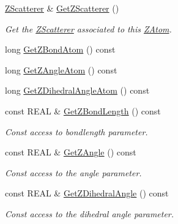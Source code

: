 \begin{DoxyCompactItemize}
\mbox{\label{class_obj_cryst_1_1_z_atom_aaf3d27dfba9cf85e2ef08abe17b6d309}} 
\mbox{\hyperlink{class_obj_cryst_1_1_z_scatterer}{Z\+Scatterer}} \& \mbox{\hyperlink{class_obj_cryst_1_1_z_atom_aaf3d27dfba9cf85e2ef08abe17b6d309}{Get\+Z\+Scatterer}} ()
\begin{DoxyCompactList}\small\item\em Get the \mbox{\hyperlink{class_obj_cryst_1_1_z_scatterer}{Z\+Scatterer}} associated to this \mbox{\hyperlink{class_obj_cryst_1_1_z_atom}{Z\+Atom}}. \end{DoxyCompactList}\item 
long \mbox{\hyperlink{class_obj_cryst_1_1_z_atom_ad562588cedd0e9e3eaee2dae1a4afa3e}{Get\+Z\+Bond\+Atom}} () const
\item 
long \mbox{\hyperlink{class_obj_cryst_1_1_z_atom_a058aa7bd3176e67001fdb7ee54594793}{Get\+Z\+Angle\+Atom}} () const
\item 
long \mbox{\hyperlink{class_obj_cryst_1_1_z_atom_a0c13c96b5329c654de8fa039edaffdee}{Get\+Z\+Dihedral\+Angle\+Atom}} () const
\item 
\mbox{\label{class_obj_cryst_1_1_z_atom_ae4a271658e07416c929254d33a17acd2}} 
const R\+E\+AL \& \mbox{\hyperlink{class_obj_cryst_1_1_z_atom_ae4a271658e07416c929254d33a17acd2}{Get\+Z\+Bond\+Length}} () const
\begin{DoxyCompactList}\small\item\em Const access to bondlength parameter. \end{DoxyCompactList}\item 
\mbox{\label{class_obj_cryst_1_1_z_atom_aed06248c63d52f3537c4c750271031df}} 
const R\+E\+AL \& \mbox{\hyperlink{class_obj_cryst_1_1_z_atom_aed06248c63d52f3537c4c750271031df}{Get\+Z\+Angle}} () const
\begin{DoxyCompactList}\small\item\em Const access to the angle parameter. \end{DoxyCompactList}\item 
\mbox{\label{class_obj_cryst_1_1_z_atom_a07b4b18233aba3ea87fa7fc23b6467a2}} 
const R\+E\+AL \& \mbox{\hyperlink{class_obj_cryst_1_1_z_atom_a07b4b18233aba3ea87fa7fc23b6467a2}{Get\+Z\+Dihedral\+Angle}} () const
\begin{DoxyCompactList}\small\item\em Const access to the dihedral angle parameter. \end{DoxyCompactList}\item 

\end{DoxyCompactItemize}
